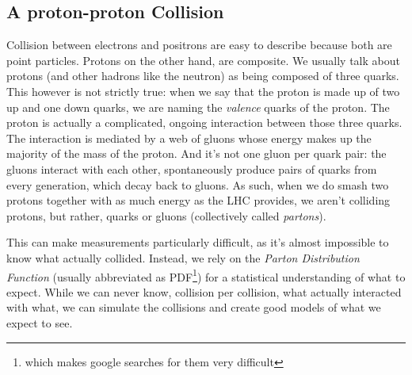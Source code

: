 \subsection{A \textbf{proton-proton} Collision}
Collision between electrons and positrons are easy to describe because both are point particles. Protons on the other hand, are composite. We usually talk about protons (and other hadrons like the neutron) as being composed of three quarks. This however is not strictly true: when we say that the proton is made up of two up and one down quarks, we are naming the \textit{valence} quarks of the proton. The proton is actually a complicated, ongoing interaction between those three quarks. The interaction is mediated by a web of gluons whose energy makes up the majority of the mass of the proton. And it's not one gluon per quark pair: the gluons interact with each other, spontaneously produce pairs of quarks from every generation, which decay back to gluons. As such, when we do smash two protons together with as much energy as the LHC provides, we aren't colliding protons, but rather, quarks or gluons (collectively called \textit{partons}).

This can make measurements particularly difficult, as it's almost impossible to know what actually collided. Instead, we rely on the \textit{Parton Distribution Function} (usually abbreviated as PDF\footnote{which makes google searches for them very difficult})\cite{Bourilkov:2006cj,Ball:2014uwa} for a statistical understanding of what to expect. While we can never know, collision per collision, what actually interacted with what, we can simulate the collisions and create good models of what we expect to see.

